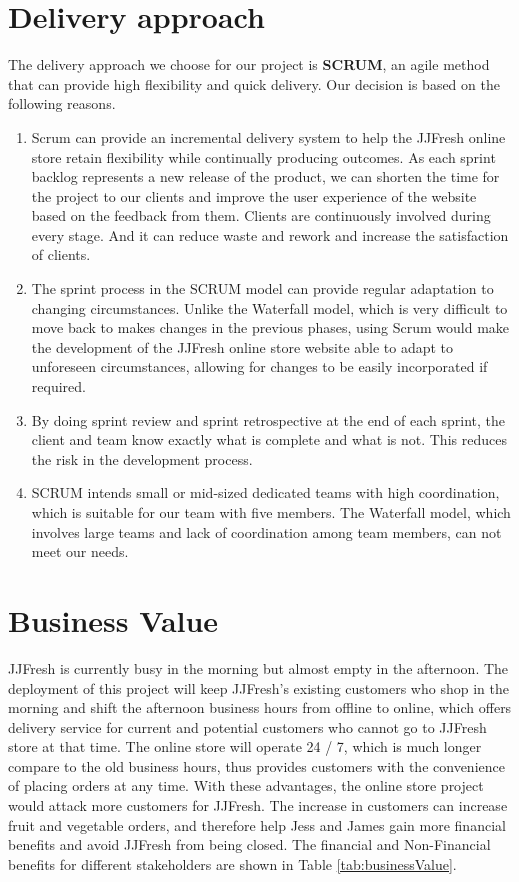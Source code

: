 \documentclass{report}
\begin{document}
\section{Delivery approach}
The delivery approach we choose for our project is \textbf{SCRUM}, an agile method that can provide high flexibility and quick delivery. Our decision is based on the following reasons.
\begin{enumerate}
  \item Scrum can provide an incremental delivery system to help the JJFresh online store retain flexibility while continually producing outcomes. As each sprint backlog represents a new release of the product, we can shorten the time for the project to our clients and improve the user experience of the website based on the feedback from them. Clients are continuously involved during every stage. And it can reduce waste and rework and increase the satisfaction of clients.
  \item The sprint process in the SCRUM model can provide regular adaptation to changing circumstances. Unlike the Waterfall model, which is very difficult to move back to makes changes in the previous phases, using Scrum would make the development of the JJFresh online store website able to adapt to unforeseen circumstances, allowing for changes to be easily incorporated if required.
  \item By doing sprint review and sprint retrospective at the end of each sprint, the client and team know exactly what is complete and what is not. This reduces the risk in the development process.
  \item SCRUM intends small or mid-sized dedicated teams with high coordination, which is suitable for our team with five members. The Waterfall model, which involves large teams and lack of coordination among team members, can not meet our needs.
\end{enumerate}
\section{Business Value}
JJFresh is currently busy in the morning but almost empty in the afternoon. The deployment of this project will keep JJFresh's existing customers who shop in the morning and shift the afternoon business hours from offline to online, which offers delivery service for current and potential customers who cannot go to JJFresh store at that time. The online store will operate 24 / 7, which is much longer compare to the old business hours, thus provides customers with the convenience of placing orders at any time. With these advantages, the online store project would attack more customers for JJFresh. The increase in customers can increase fruit and vegetable orders, and therefore help Jess and James gain more financial benefits and avoid JJFresh from being closed. The financial and Non-Financial benefits for different stakeholders are shown in Table \ref{tab:businessValue}.
\end{document}
